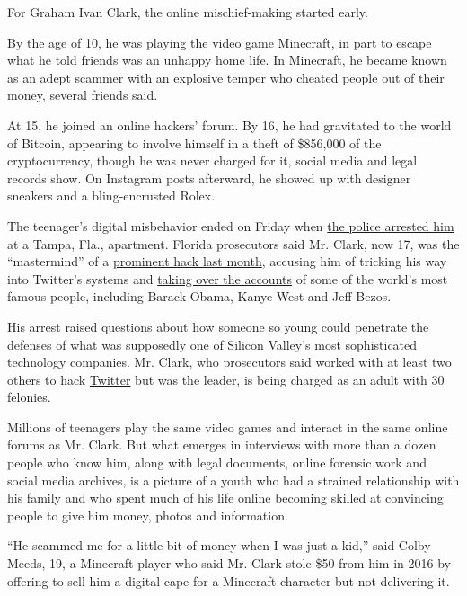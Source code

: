 For Graham Ivan Clark, the online mischief-making started early.

By the age of 10, he was playing the video game Minecraft, in part to
escape what he told friends was an unhappy home life. In Minecraft, he
became known as an adept scammer with an explosive temper who cheated
people out of their money, several friends said.

At 15, he joined an online hackers' forum. By 16, he had gravitated to
the world of Bitcoin, appearing to involve himself in a theft of
\$856,000 of the cryptocurrency, though he was never charged for it,
social media and legal records show. On Instagram posts afterward, he
showed up with designer sneakers and a bling-encrusted Rolex.

The teenager's digital misbehavior ended on Friday when
\href{https://www.nytimes.com/2020/07/31/technology/twitter-hack-arrest.html}{the
police arrested him} at a Tampa, Fla., apartment. Florida prosecutors
said Mr. Clark, now 17, was the ``mastermind'' of a
\href{https://www.nytimes.com/2020/07/17/technology/twitter-hackers-interview.html}{prominent
hack last month}, accusing him of tricking his way into Twitter's
systems and
\href{https://www.nytimes.com/2020/07/15/technology/twitter-hack-bill-gates-elon-musk.html}{taking
over the accounts} of some of the world's most famous people, including
Barack Obama, Kanye West and Jeff Bezos.

His arrest raised questions about how someone so young could penetrate
the defenses of what was supposedly one of Silicon Valley's most
sophisticated technology companies. Mr. Clark, who prosecutors said
worked with at least two others to hack
\href{https://www.nytimes.com/2020/08/03/technology/ftc-twitter-privacy-violations.html}{Twitter}
but was the leader, is being charged as an adult with 30 felonies.

Millions of teenagers play the same video games and interact in the same
online forums as Mr. Clark. But what emerges in interviews with more
than a dozen people who know him, along with legal documents, online
forensic work and social media archives, is a picture of a youth who had
a strained relationship with his family and who spent much of his life
online becoming skilled at convincing people to give him money, photos
and information.

``He scammed me for a little bit of money when I was just a kid,'' said
Colby Meeds, 19, a Minecraft player who said Mr. Clark stole \$50 from
him in 2016 by offering to sell him a digital cape for a Minecraft
character but not delivering it.

